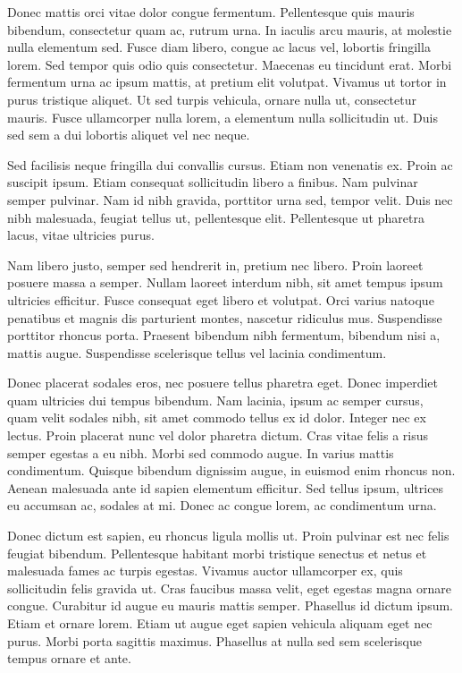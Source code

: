 \documentclass{article}
\begin{document}
Donec mattis orci vitae dolor congue fermentum. Pellentesque quis mauris bibendum, consectetur quam ac, rutrum urna. In iaculis arcu mauris, at molestie nulla elementum sed. Fusce diam libero, congue ac lacus vel, lobortis fringilla lorem. Sed tempor quis odio quis consectetur. Maecenas eu tincidunt erat. Morbi fermentum urna ac ipsum mattis, at pretium elit volutpat. Vivamus ut tortor in purus tristique aliquet. Ut sed turpis vehicula, ornare nulla ut, consectetur mauris. Fusce ullamcorper nulla lorem, a elementum nulla sollicitudin ut. Duis sed sem a dui lobortis aliquet vel nec neque.

Sed facilisis neque fringilla dui convallis cursus. Etiam non venenatis ex. Proin ac suscipit ipsum. Etiam consequat sollicitudin libero a finibus. Nam pulvinar semper pulvinar. Nam id nibh gravida, porttitor urna sed, tempor velit. Duis nec nibh malesuada, feugiat tellus ut, pellentesque elit. Pellentesque ut pharetra lacus, vitae ultricies purus.

Nam libero justo, semper sed hendrerit in, pretium nec libero. Proin laoreet posuere massa a semper. Nullam laoreet interdum nibh, sit amet tempus ipsum ultricies efficitur. Fusce consequat eget libero et volutpat. Orci varius natoque penatibus et magnis dis parturient montes, nascetur ridiculus mus. Suspendisse porttitor rhoncus porta. Praesent bibendum nibh fermentum, bibendum nisi a, mattis augue. Suspendisse scelerisque tellus vel lacinia condimentum.

Donec placerat sodales eros, nec posuere tellus pharetra eget. Donec imperdiet quam ultricies dui tempus bibendum. Nam lacinia, ipsum ac semper cursus, quam velit sodales nibh, sit amet commodo tellus ex id dolor. Integer nec ex lectus. Proin placerat nunc vel dolor pharetra dictum. Cras vitae felis a risus semper egestas a eu nibh. Morbi sed commodo augue. In varius mattis condimentum. Quisque bibendum dignissim augue, in euismod enim rhoncus non. Aenean malesuada ante id sapien elementum efficitur. Sed tellus ipsum, ultrices eu accumsan ac, sodales at mi. Donec ac congue lorem, ac condimentum urna.

Donec dictum est sapien, eu rhoncus ligula mollis ut. Proin pulvinar est nec felis feugiat bibendum. Pellentesque habitant morbi tristique senectus et netus et malesuada fames ac turpis egestas. Vivamus auctor ullamcorper ex, quis sollicitudin felis gravida ut. Cras faucibus massa velit, eget egestas magna ornare congue. Curabitur id augue eu mauris mattis semper. Phasellus id dictum ipsum. Etiam et ornare lorem. Etiam ut augue eget sapien vehicula aliquam eget nec purus. Morbi porta sagittis maximus. Phasellus at nulla sed sem scelerisque tempus ornare et ante.
\end{document}
